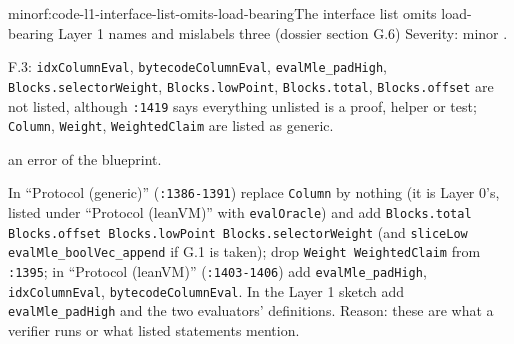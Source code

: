 \begin{finding}{minor}{f:code-l1-interface-list-omits-load-bearing}{The interface list omits load-bearing Layer 1 names and mislabels three (dossier section G.6)}
Severity: minor .

F.3: \texttt{idxColumnEval}, \texttt{bytecodeColumnEval}, \texttt{evalMle\_\allowbreak{}padHigh}, \texttt{Blocks.\allowbreak{}selectorWeight}, \texttt{Blocks.\allowbreak{}lowPoint}, \texttt{Blocks.\allowbreak{}total}, \texttt{Blocks.\allowbreak{}offset} are not listed, although \texttt{:1419} says everything unlisted is a proof, helper or test; \texttt{Column}, \texttt{Weight}, \texttt{WeightedClaim} are listed as generic.

an error of the blueprint.

In \enquote{Protocol (generic)} (\texttt{:1386-{}1391}) replace \texttt{Column} by nothing (it is Layer 0's, listed under \enquote{Protocol (leanVM)} with \texttt{evalOracle}) and add \texttt{B\allowbreak{}l\allowbreak{}o\allowbreak{}c\allowbreak{}k\allowbreak{}s\allowbreak{}.\allowbreak{}t\allowbreak{}o\allowbreak{}t\allowbreak{}a\allowbreak{}l\allowbreak{} B\allowbreak{}l\allowbreak{}o\allowbreak{}c\allowbreak{}k\allowbreak{}s\allowbreak{}.\allowbreak{}o\allowbreak{}f\allowbreak{}f\allowbreak{}s\allowbreak{}e\allowbreak{}t\allowbreak{} B\allowbreak{}l\allowbreak{}o\allowbreak{}c\allowbreak{}k\allowbreak{}s\allowbreak{}.\allowbreak{}l\allowbreak{}o\allowbreak{}w\allowbreak{}P\allowbreak{}o\allowbreak{}i\allowbreak{}n\allowbreak{}t\allowbreak{} B\allowbreak{}l\allowbreak{}o\allowbreak{}c\allowbreak{}k\allowbreak{}s\allowbreak{}.\allowbreak{}s\allowbreak{}e\allowbreak{}l\allowbreak{}e\allowbreak{}c\allowbreak{}t\allowbreak{}o\allowbreak{}r\allowbreak{}W\allowbreak{}e\allowbreak{}i\allowbreak{}g\allowbreak{}h\allowbreak{}t} (and \texttt{s\allowbreak{}l\allowbreak{}i\allowbreak{}c\allowbreak{}e\allowbreak{}L\allowbreak{}o\allowbreak{}w\allowbreak{} e\allowbreak{}v\allowbreak{}a\allowbreak{}l\allowbreak{}M\allowbreak{}l\allowbreak{}e\allowbreak{}\_\allowbreak{}b\allowbreak{}o\allowbreak{}o\allowbreak{}l\allowbreak{}V\allowbreak{}e\allowbreak{}c\allowbreak{}\_\allowbreak{}a\allowbreak{}p\allowbreak{}p\allowbreak{}e\allowbreak{}n\allowbreak{}d} if G.1 is taken); drop \texttt{Weight WeightedClaim} from \texttt{:1395}; in \enquote{Protocol (leanVM)} (\texttt{:1403-{}1406}) add \texttt{evalMle\_\allowbreak{}padHigh}, \texttt{idxColumnEval}, \texttt{bytecodeColumnEval}. In the Layer 1 sketch add \texttt{evalMle\_\allowbreak{}padHigh} and the two evaluators' definitions. Reason: these are what a verifier runs or what listed statements mention.

\end{finding}

